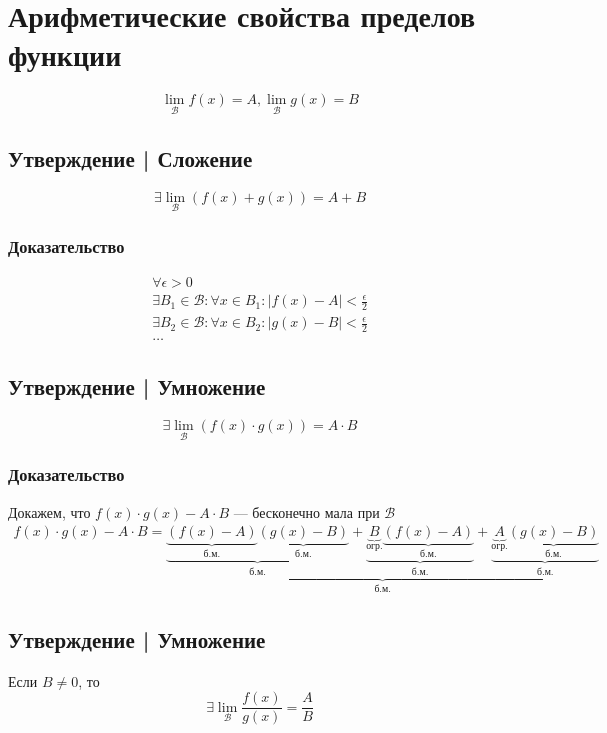 \documentclass{article}
\begin{document}
\section{Арифметические свойства пределов функции}
\[
    \lim_{\mathcal{B}} f(x) = A, \lim_{\mathcal{B}} g(x) = B
\]

\subsection{Утверждение | Сложение}
\[
    \exists \lim_{\mathcal{B}} (f(x) + g(x)) = A + B
\]

\subsubsection{Доказательство}
\begin{gather*}
    \forall \epsilon > 0 \\
    \exists B_1 \in \mathcal{B}: \forall x \in B_1: |f(x) - A| < \frac{\epsilon}{2} \\
    \exists B_2 \in \mathcal{B}: \forall x \in B_2: |g(x) - B| < \frac{\epsilon}{2} \\
    \dots
\end{gather*}


\subsection{Утверждение | Умножение}
\[
    \exists \lim_{\mathcal{B}} (f(x) \cdot g(x)) = A \cdot B
\]

\subsubsection{Доказательство}
Докажем, что $f(x) \cdot g(x) - A \cdot B$ --- бесконечно мала при $\mathcal{B}$
\begin{gather*}
    f(x) \cdot g(x) - A \cdot B = 
    \underbrace{\underbrace{\underbrace{(f(x) - A)}_{\text{б.м.}} \underbrace{(g(x) - B)}_{\text{б.м.}}}_{\text{б.м.}} + 
    \underbrace{\underbrace{B}_{\text{огр.}} \underbrace{(f(x) - A)}_{\text{б.м.}}}_{\text{б.м.}} + 
    \underbrace{\underbrace{A}_{\text{огр.}} \underbrace{(g(x) - B)}_{\text{б.м.}}}_{\text{б.м.}}}_{\text{б.м.}}
\end{gather*}


\subsection{Утверждение | Умножение}
Если $B \neq 0$, то 
\[
    \exists \lim_{\mathcal{B}} \frac{f(x)}{g(x)} = \frac{A}{B}
\]
\end{document}
